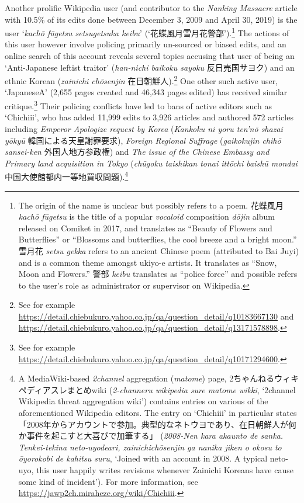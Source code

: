 \documentclass[10pt,british,A4paper,,openany]{memoir}
\begin{document}
Another prolific Wikipedia user (and contributor to the \emph{Nanking
Massacre} article with 10.5\% of its edits done between December 3, 2009
and April 30, 2019) is the user `\emph{kachō fūgetsu setsugetsuka
keibu}' (`花蝶風月雪月花警部').\footnote{The origin of the name is
  unclear but possibly refers to a poem. 花蝶風月 \emph{kachō fūgetsu}
  is the title of a popular \emph{vocaloid} composition \emph{dōjin}
  album released on Comiket in 2017, and translates as ``Beauty of
  Flowers and Butterflies'' or ``Blossoms and butterflies, the cool
  breeze and a bright moon.'' 雪月花 \emph{setsu gekka} refers to an
  ancient Chinese poem (attributed to Bai Juyi) and is a common theme
  amongst ukiyo-e artists. It translates as ``Snow, Moon and Flowers.''
  警部 \emph{keibu} translates as ``police force'' and possible refers
  to the user's role as administrator or supervisor on Wikipedia.} The
actions of this user however involve policing primarily un-sourced or
biased edits, and an online search of this account reveals several
topics accusing that user of being an `Anti-Japanese leftist traitor'
(\emph{han-nichi baikoku sayoku} 反日売国サヨク) and an ethnic Korean
(\emph{zainichi chōsenjin} 在日朝鮮人).\footnote{See for example
  \url{https://detail.chiebukuro.yahoo.co.jp/qa/question_detail/q10183667130}
  and
  \url{https://detail.chiebukuro.yahoo.co.jp/qa/question_detail/q13171578898}.}
One other such active user, `JapaneseA' (2,655 pages created and 46,343
pages edited) has received similar critique.\footnote{See for example
  \url{https://detail.chiebukuro.yahoo.co.jp/qa/question_detail/q10171294600}.}
Their policing conflicts have led to bans of active editors such as
`Chichiii', who has added 11,999 edits to 3,926 articles and authored
572 articles including \emph{Emperor Apologize request by Korea}
(\emph{Kankoku ni yoru ten'nō shazai yōkyū} 韓国による天皇謝罪要求),
\emph{Foreign Regional Suffrage} (\emph{gaikokujin chihō sansei-ken}
外国人地方参政権) and \emph{The issue of the Chinese Embassy and Primary
land acquisition in Tokyo} (\emph{chūgoku taishikan tonai ittōchi baishū
mondai} 中国大使館都内一等地買収問題).\footnote{A MediaWiki-based
  \emph{2channel} aggregation (\emph{matome}) page,
  2ちゃんねるウィキペディアスレまとめwiki (\emph{2-channeru wikipedia
  sure matome wikki}, `2channel Wikipedia threat aggregation wiki')
  contains entries on various of the aforementioned Wikipedia editors.
  The entry on `Chichiii' in particular states
  「2008年からアカウントで参加。典型的なネトウヨであり、在日朝鮮人が何か事件を起こすと大喜びで加筆する」
  (\emph{2008-Nen kara akaunto de sanka. Tenkei-tekina neto-uyodeari,
  zainichichōsenjin ga nanika jiken o okosu to ōyorokobi de kahitsu
  suru}, `Joined with an account in 2008. A typical neto-uyo, this user
  happily writes revisions whenever Zainichi Koreans have cause some
  kind of incident'). For more information, see
  \url{https://jawp2ch.miraheze.org/wiki/Chichiii}.}
\end{document}

